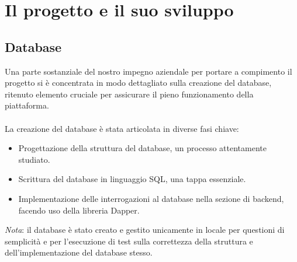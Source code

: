 \chapter{Il progetto e il suo sviluppo}\label{chapter:formattazione}
%
\section{Database}\label{sec:cap_sec_subsec}
Una parte sostanziale del nostro impegno aziendale per portare a compimento il 
progetto si è concentrata in modo dettagliato sulla creazione del database, ritenuto 
elemento cruciale per assicurare il pieno funzionamento della piattaforma.
\\ \\
La creazione del database è stata articolata in diverse fasi chiave:
\begin{itemize}
	\item Progettazione della struttura del database, un processo attentamente studiato.
	\item Scrittura del database in linguaggio SQL, una tappa essenziale.
	\item Implementazione delle interrogazioni al database nella sezione di backend, facendo uso della libreria Dapper.
\end{itemize}
\textit{Nota}: il database è stato creato e gestito unicamente in locale per questioni di semplicità e per
l'esecuzione di test sulla correttezza della struttura e dell'implementazione del database stesso.
%
%
